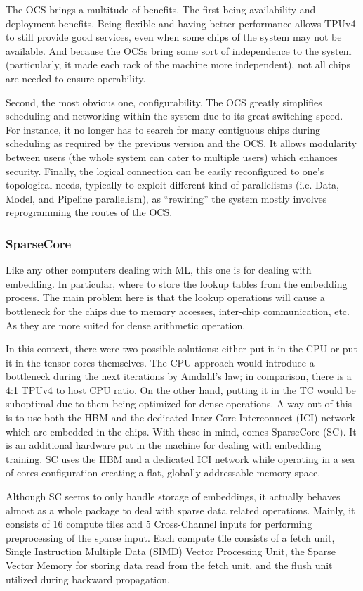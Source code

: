 The OCS brings a multitude of benefits.
The first being availability and deployment benefits.
Being flexible and having better performance allows TPUv4 to still provide good services, even when some chips of the system may not be available.
And because the OCSs bring some sort of independence to the system (particularly, it made each rack of the machine more independent), not all chips are needed to ensure operability.

Second, the most obvious one, configurability.
The OCS greatly simplifies scheduling and networking within the system due to its great switching speed.
For instance, it no longer has to search for many contiguous chips during scheduling as required by the previous version and the OCS. It allows modularity between users (the whole system can cater to multiple users) which enhances security.
Finally, the logical connection can be easily reconfigured to one's topological needs, typically to exploit different kind of parallelisms (i.e. Data, Model, and Pipeline parallelism), as ``rewiring'' the system mostly involves reprogramming the routes of the OCS\@.

\subsubsection{SparseCore}
Like any other computers dealing with ML, this one is for dealing with embedding.
In particular, where to store the lookup tables from the embedding process.
The main problem here is that the lookup operations will cause a bottleneck for the chips due to memory accesses, inter-chip communication, etc.
As they are more suited for dense arithmetic operation.

In this context, there were two possible solutions: either put it in the CPU or put it in the tensor cores themselves.
The CPU approach would introduce a bottleneck during the next iterations by Amdahl’s law; in comparison, there is a 4:1 TPUv4 to host CPU ratio.
On the other hand, putting it in the TC would be suboptimal due to them being optimized for dense operations.
A way out of this is to use both the HBM and the dedicated Inter-Core Interconnect (ICI) network which are embedded in the chips.
With these in mind, comes SparseCore (SC).
It is an additional hardware put in the machine for dealing with embedding training.
SC uses the HBM and a dedicated ICI network while operating in a sea of cores configuration creating a flat, globally addressable memory space.

Although SC seems to only handle storage of embeddings, it actually behaves almost as a whole package to deal with sparse data related operations.
Mainly, it consists of 16 compute tiles and 5 Cross-Channel inputs for performing preprocessing of the sparse input.
Each compute tile consists of a fetch unit, Single Instruction Multiple Data (SIMD) Vector Processing Unit, the Sparse Vector Memory for storing data read from the fetch unit, and the flush unit utilized during backward propagation.


